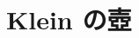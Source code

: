 \documentclass[report]{jlreq}
\begin{document}
%
\section{Klein の壺}

\begin{definition}[Klein の壺]
    \TODO{}
\end{definition}
\end{document}
